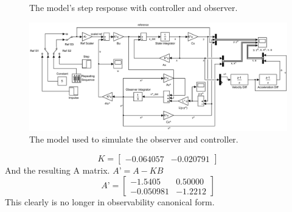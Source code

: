 \documentclass[final]{scrreprt} %
\begin{document}
\begin{figure}[H]
	\centering
    	\setlength\figureheight{4cm}
    	\setlength{}
    	    	
    	\caption{The model’s step response with controller and observer.}
    	\label{fig:model-step-response}
\end{figure}
\begin{figure}[H]
	\vspace*{-1.8cm}
	\centering    	
    	\includegraphics[angle=90, height=1.2\textheight]{resources/model.pdf}
    	\caption{The model used to simulate the observer and controller.}
    	\label{fig:simulink-model}
\end{figure}
\begin{equation}
K=
\begin{bmatrix}
  -0.064057 & -0.020791
 \end{bmatrix}
\end{equation}
And the resulting A matrix. $A’=A-KB$
\begin{equation}
A’=
\begin{bmatrix}
   -1.5405& 0.50000\\
   -0.050981 &  -1.2212
 \end{bmatrix}
\end{equation}
This clearly is no longer in observability canonical form.
\end{document}
